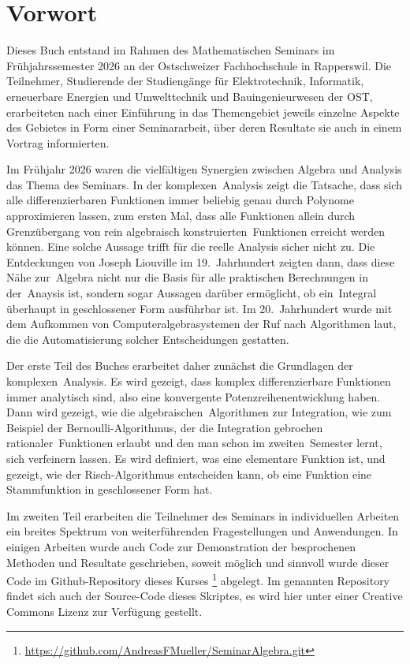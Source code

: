 %
%
%
\chapter*{Vorwort}

\noindent
Dieses Buch entstand im Rahmen des Mathematischen Seminars
im Frühjahrssemester 2026 an der Ostschweizer Fachhochschule in Rapperswil.
Die Teilnehmer, Studierende der Studiengänge für Elektrotechnik, Informatik,
erneuerbare Energien und Umwelttechnik und Bauingenieurwesen
der OST, erarbeiteten nach einer Einführung in das Themengebiet jeweils
einzelne Aspekte des Gebietes in Form einer Seminararbeit, über
deren Resultate sie auch in einem Vortrag informierten. 

Im Frühjahr 2026 waren die vielfältigen Synergien zwischen Algebra
und Analysis das Thema des Seminars.
In der komplexen Analysis zeigt die Tatsache, dass sich alle
differenzierbaren Funktionen immer beliebig genau durch Polynome
approximieren lassen, zum ersten Mal, dass alle Funktionen allein
durch Grenzübergang von rein algebraisch konstruierten Funktionen
erreicht werden können.
Eine solche Aussage trifft für die reelle Analysis sicher nicht zu.
Die Entdeckungen von Joseph Liouville im 19.~Jahrhundert zeigten dann,
dass diese Nähe zur Algebra nicht nur die Basis für alle praktischen
Berechnungen in der Anaysis ist, sondern sogar Aussagen darüber ermöglicht,
ob ein Integral überhaupt in geschlossener Form ausführbar ist.
Im 20.~Jahrhundert wurde mit dem Aufkommen von Computeralgebrasystemen
der Ruf nach Algorithmen laut, die die Automatisierung solcher
Entscheidungen gestatten.

Der erste Teil des Buches erarbeitet daher zunächst die Grundlagen
der komplexen Analysis.
Es wird gezeigt, dass komplex differenzierbare Funktionen immer
analytisch sind, also eine konvergente Potenzreihenentwicklung haben.
Dann wird gezeigt, wie die algebraischen Algorithmen zur Integration,
wie zum Beispiel der Bernoulli-Algorithmus, der die Integration
gebrochen rationaler Funktionen erlaubt und den man
schon im zweiten Semester lernt, sich verfeinern lassen.
Es wird definiert, was eine elementare Funktion ist, und gezeigt, wie
der Risch-Algorithmus entscheiden kann, ob eine Funktion eine
Stammfunktion in geschlossener Form hat.

Im zweiten Teil erarbeiten die Teilnehmer des Seminars in individuellen
Arbeiten ein breites Spektrum von weiterführenden Fragestellungen
und Anwendungen.
In einigen Arbeiten wurde auch Code zur Demonstration der 
besprochenen Methoden und Resultate geschrieben, soweit
möglich und sinnvoll wurde dieser Code im Github-Repository
%
dieses Kurses%
\footnote{\url{https://github.com/AndreasFMueller/SeminarAlgebra.git}}
\cite{buch:repo}
abgelegt.
Im genannten Repository findet sich auch der Source-Code dieses
Skriptes, es wird hier unter einer Creative Commons Lizenz
zur Verfügung gestellt.


